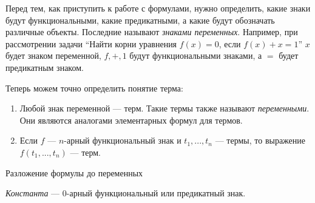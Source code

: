 Перед тем, как приступить к работе с формулами, нужно определить, какие
знаки будут функциональными, какие предикатными, а какие будут
обозначать различные объекты.
Последние называют {\it знаками переменных}.
Например, при рассмотрении задачи ``Найти корни уравнения $f(x)=0$,
если $f(x)+x=1$'' $x$ будет знаком переменной, $f,+,1$ будут
функциональными знаками, а $=$ будет предикатным знаком.

Теперь можем точно определить понятие терма:
\begin{enumerate}
  \item{}Любой знак переменной --- терм. Такие термы также
  называют {\it переменными}. Они являются аналогами элементарных формул
  для термов.

  \item{}Если $f$ --- $n$-арный функциональный знак и $t_1,...,t_{n}$ --- термы,
  то выражение $f(t_1,...,t_{n})$ --- терм.
\end{enumerate}

\newcommand\eps{\varepsilon}
\begin{marginfigure}
  \centering

  \caption{Разложение формулы до переменных}\label{fig:form_var}
\end{marginfigure}

{\it Константа} --- $0$-арный
функциональный или предикатный знак.

